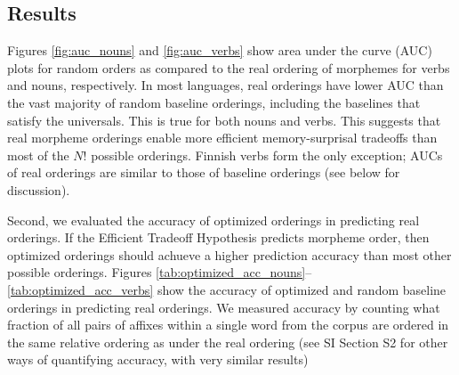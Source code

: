 \documentclass[man]{apa7}
\newcommand{\citet}{\Textcite}
\begin{document}



\subsection{Results}

Figures \ref{fig:auc_nouns} and \ref{fig:auc_verbs} show area under the curve (AUC) plots for random orders as compared to the real ordering of morphemes for verbs and nouns, respectively.
In most languages, real orderings have lower AUC than the vast majority of random baseline orderings, including the baselines that satisfy the universals. This is true for both nouns and verbs. This suggests that real morpheme orderings enable more efficient memory-surprisal tradeoffs than most of the $N!$ possible orderings.
Finnish verbs form the only exception; AUCs of real orderings are similar to those of baseline orderings (see below for discussion).

Second, we evaluated the accuracy of optimized orderings in predicting real orderings.
If the Efficient Tradeoff Hypothesis predicts morpheme order, then optimized orderings should achueve a higher prediction accuracy than most other possible orderings.
Figures \ref{tab:optimized_acc_nouns}--\ref{tab:optimized_acc_verbs} show the accuracy of optimized and random baseline orderings in predicting real orderings. 
We measured accuracy by counting what fraction of all pairs of affixes within a single word from the corpus are ordered in the same relative ordering as under the real ordering (see SI Section S2 for other ways of quantifying accuracy, with very similar results)
\end{document}
